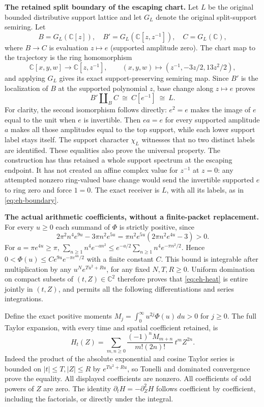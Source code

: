 \EH\textbf{The retained split boundary of the escaping chart.}
Let $L$ be the original bounded distributive support lattice and let
$G_L$ denote the original split-support semiring. Let
\[
 B=G_L(\mathbb C[z]),\quad B'=G_L(\mathbb C[z,z^{-1}]),\quad
 C=G_L(\mathbb C),
\]
where $B\to C$ is evaluation $z\mapsto e$ (supported amplitude zero).
The chart map to the trajectory is the ring homomorphism
\[
 \mathbb C[x,y,w]\longrightarrow\mathbb C[z,z^{-1}],\qquad
 (x,y,w)\longmapsto(z^{-1},-3z/2,13z^2/2),
\]
and applying $G_L$ gives its exact support-preserving semiring map.
Since $B'$ is the localization of $B$ at the supported polynomial $z$,
base change along $z\mapsto e$ proves
\begin{equation}
 B'\amalg_B C\ \cong\ C[e^{-1}]\ \cong\ L.\label{eq:eh-boundary}
\end{equation}
For clarity, the second isomorphism follows directly: $e^2=e$ makes
the image of $e$ equal to the unit when $e$ is invertible. Then
$ea=e$ for every supported amplitude $a$ makes all those amplitudes
equal to the top support, while each lower support label stays itself.
The support character $\chi_L$ witnesses that no two distinct labels
are identified. These equalities also prove the universal property.
The construction has thus retained a whole support spectrum at the
escaping endpoint. It has not created an affine complex value for
$z^{-1}$ at $z=0$: any attempted nonzero ring-valued base change
would send the invertible supported $e$ to ring zero and force $1=0$.
The exact receiver is $L$, with all its labels, as in
\eqref{eq:eh-boundary}.

\EH\textbf{The actual arithmetic coefficients, without a finite-packet replacement.}
For every $u\ge0$ each summand of $\Phi$ is strictly positive, since
\[
 2\pi^2n^4e^{9u}-3\pi n^2e^{5u}
 =\pi n^2e^{5u}(2\pi n^2e^{4u}-3)>0.
\]
For $a=\pi e^{4u}\ge\pi$,
$\sum_{n\ge1}n^4 e^{-an^2}\le
e^{-a/2}\sum_{n\ge1}n^4e^{-\pi n^2/2}$.
Hence $0<\Phi(u)\le C e^{9u}e^{-\pi e^{4u}/2}$ with a finite
constant $C$. This bound is integrable after multiplication by
any $u^N e^{T u^2+Ru}$, for any fixed $N,T,R\ge0$.
Uniform domination on compact subsets of $(t,Z)\in\mathbb C^2$
therefore proves that \eqref{eq:eh-heat} is entire jointly in $(t,Z)$,
and permits all the following differentiations and series integrations.

Define the exact positive moments
$M_j=\int_0^\infty u^{2j}\Phi(u)\,du>0$ for $j\ge0$. The full
Taylor expansion, with every time and spatial coefficient retained, is
\begin{equation}
 H_t(Z)=\sum_{m,n\ge0}
 \frac{(-1)^n M_{m+n}}{m!(2n)!}\,t^m Z^{2n}.\label{eq:eh-moments}
\end{equation}
Indeed the product of the absolute exponential and cosine Taylor series
is bounded on $|t|\le T,|Z|\le R$ by $e^{Tu^2+Ru}$, so Tonelli and
dominated convergence prove the equality. All displayed coefficients
are nonzero. All coefficients of odd powers of $Z$ are zero.
The identity $\partial_tH=-\partial_Z^2H$ follows coefficient by
coefficient, including the factorials, or directly under the integral.

